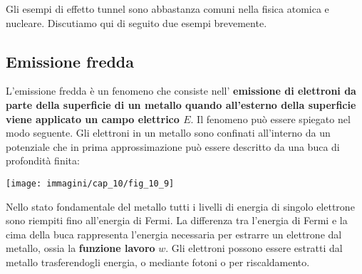 Gli esempi di effetto tunnel sono abbastanza comuni nella fisica atomica e nucleare. Discutiamo qui di seguito due esempi brevemente.
\subsection{Emissione fredda}
L'emissione fredda è un fenomeno che consiste nell' \textbf{emissione di elettroni da parte della superficie di un metallo quando all'esterno della superficie viene applicato un campo elettrico $E$}. Il fenomeno può essere spiegato nel modo seguente. Gli elettroni in un metallo sono confinati all'interno da un potenziale che in prima approssimazione può essere descritto da una buca di profondità finita:
\begin{center}
\texttt{[image: immagini/cap\_10/fig\_10\_9]}
\end{center} 
Nello stato fondamentale del metallo tutti i livelli di energia di singolo elettrone sono riempiti fino all'energia di Fermi. La differenza tra l'energia di Fermi e la cima della buca rappresenta l'energia necessaria per estrarre un elettrone dal metallo, ossia la \textbf{funzione lavoro} $w$. 
Gli elettroni possono essere estratti dal metallo trasferendogli energia, o mediante fotoni o per riscaldamento.\\

